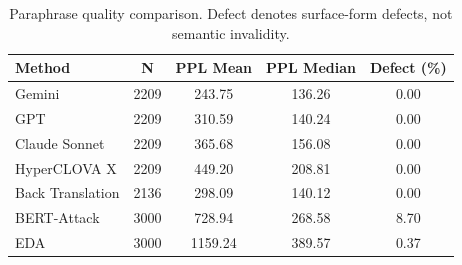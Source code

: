 \begin{table}[h]
\centering
\caption{Paraphrase quality comparison. Defect denotes surface-form defects, not semantic invalidity.}
\label{tab:quality}
\begin{tabular}{lcccc}
\hline
Method & N & PPL Mean & PPL Median & Defect (\%) \\
\hline
Gemini & 2209 & 243.75 & 136.26 & 0.00 \\
GPT & 2209 & 310.59 & 140.24 & 0.00 \\
Claude Sonnet & 2209 & 365.68 & 156.08 & 0.00 \\
HyperCLOVA X & 2209 & 449.20 & 208.81 & 0.00 \\
\hline
Back Translation & 2136 & 298.09 & 140.12 & 0.00 \\
BERT-Attack & 3000 & 728.94 & 268.58 & 8.70 \\
EDA & 3000 & 1159.24 & 389.57 & 0.37 \\
\hline
\end{tabular}
\end{table}